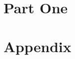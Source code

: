 \documentclass[12pt,twoside]{report}
\begin{document}
    
    \newpage
    
    
    \newpage
    
    \chapter{Part One}
    

    \appendix
    \chapter{Appendix}
    
\end{document}
